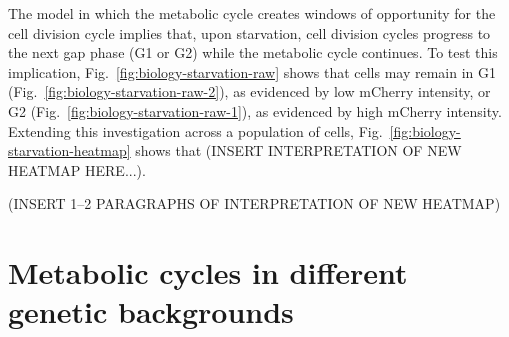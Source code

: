 The model in which the metabolic cycle creates windows of opportunity for the cell division cycle implies that, upon starvation, cell division cycles progress to the next gap phase (G1 or G2) while the metabolic cycle continues.
To test this implication, Fig.\ \ref{fig:biology-starvation-raw} shows that cells may remain in G1 (Fig.\ \ref{fig:biology-starvation-raw-2}), as evidenced by low mCherry intensity, or G2 (Fig.\ \ref{fig:biology-starvation-raw-1}), as evidenced by high mCherry intensity.
Extending this investigation across a population of cells, Fig.\ \ref{fig:biology-starvation-heatmap} shows that (INSERT INTERPRETATION OF NEW HEATMAP HERE...).

(INSERT 1--2 PARAGRAPHS OF INTERPRETATION OF NEW HEATMAP)


\section{Metabolic cycles in different genetic backgrounds}
\label{sec:biology-backgrounds}


